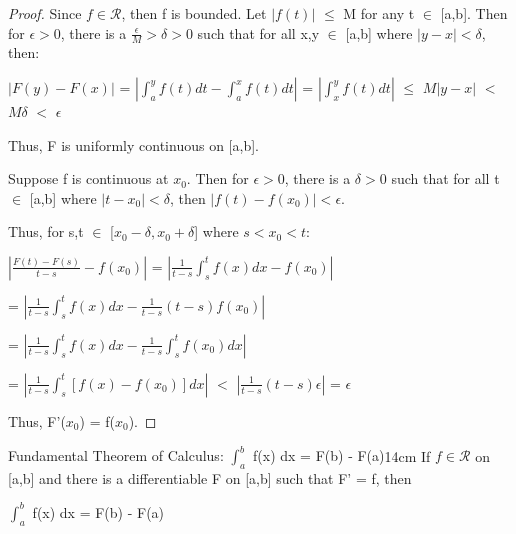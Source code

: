     \begin{proof}
        Since $f \in \mathscr{R}$, then f is bounded.
        Let $|f(t)|$ $\leq$ M for any t $\in$ [a,b].
        Then for $\epsilon > 0$, there is a $\frac{\epsilon}{M} > \delta > 0$
        such that for all x,y $\in$ [a,b] where $|y-x| < \delta$, then:

        \hspace{0.5cm}
        $|F(y) - F(x)|$
        = $|\int_a^y f(t) dt - \int_a^x f(t) dt|$
        = $|\int_x^y f(t) dt|$
        $\leq$ $M|y-x|$
        $<$ $M\delta$
        $<$ $\epsilon$

        Thus, F is uniformly continuous on [a,b].

        Suppose f is continuous at $x_0$.
        Then for $\epsilon > 0$, there is a $\delta > 0$ such that
        for all t $\in$ [a,b] where $|t - x_0| < \delta$, then
        $|f(t) - f(x_0)| < \epsilon$.

        Thus, for s,t $\in$ [$x_0-\delta,x_0+\delta$] where $s < x_0 < t$:

        \hspace{0.5cm}
        $|\frac{F(t) - F(s)}{t-s} - f(x_0)|$
        = $|\frac{1}{t-s} \int_s^t f(x) dx - f(x_0)|$

        \hspace{3.8cm}
        = $|\frac{1}{t-s} \int_s^t f(x) dx - \frac{1}{t-s} (t-s) f(x_0)|$

        \hspace{3.8cm}
        = $|\frac{1}{t-s} \int_s^t f(x) dx - \frac{1}{t-s} \int_s^t f(x_0) dx|$

        \hspace{3.8cm}
        = $|\frac{1}{t-s} \int_s^t [f(x) - f(x_0)] dx|$
        $<$ $|\frac{1}{t-s} (t-s)\epsilon|$
        = $\epsilon$

        Thus, F'($x_0$) = f($x_0$).
    \end{proof}

    \newpage



    \begin{wtheorem}{Fundamental Theorem of Calculus:
    $\int_a^b$ f(x) dx = F(b) - F(a)}{14cm}
        If $f \in \mathscr{R}$ on [a,b] and there is a differentiable F
        on [a,b] such that F' = f, then

        \hspace{0.5cm}
        $\int_a^b$ f(x) dx = F(b) - F(a)        
    \end{wtheorem}

